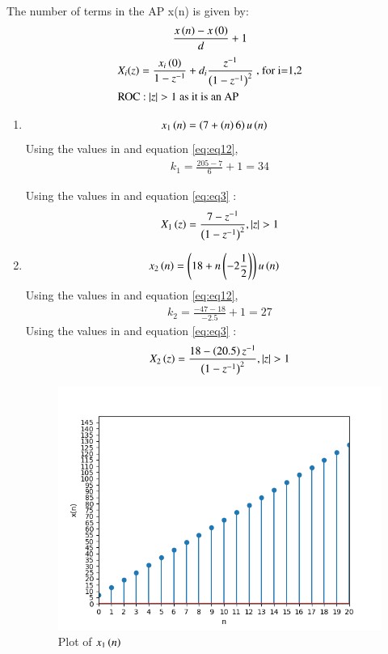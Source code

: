 \documentclass[journal,12pt,twocolumn]{IEEEtran}
\theoremstyle{remark}
\begin{document}

The number of terms in the AP x(n) is given by: 
\begin{align}  \label{eq:eq12}
    \frac{x\left(n\right) - x\left(0\right)}{d} + 1
    \end{align}
\begin{align}
    &X_i(z) = \frac{x_i\left(0\right)}{1 - z^{-1}} + d_i\frac{z^{-1}}{\left(1-z^{-1}\right)^2} \text{ , for i=1,2} \label{eq:eq3}\\
    &\text{ROC : $\left\vert z\right\vert > 1$ as it is an AP}   
\end{align}
\begin{enumerate}
    \item 
\begin{align}
x_{1}\left(n\right) &= \left(7 + \left(n\right)6\right)u\left(n\right)
\end{align}
Using the values in  and equation \eqref{eq:eq12},
\begin{align}
    k_1 = \frac{205 - 7}{6} + 1 = 34
\end{align}

Using the values in  and equation \eqref{eq:eq3} :
\begin{align}
 X_1\left(z\right) = \frac{7 - z^{-1}}{\left(1-z^{-1}\right)^2} , \left\vert z\right\vert > 1
 \end{align}
 
\item
\begin{align}
x_{2}\left(n\right) &= \left(18 + n\left(-2\frac{1}{2}\right)\right)u\left(n\right)
 \end{align}
 Using the values in  and equation \eqref{eq:eq12},
\begin{align}
    k_2 = \frac{-47 - 18}{-2.5} + 1 = 27
\end{align}
Using the values in  and equation \eqref{eq:eq3} :
\begin{align} 
 X_2\left(z\right) = \frac{18 - \left(20.5\right)z^{-1}}{\left(1 - z^{-1}\right)^2} , \left\vert z\right\vert > 1
\end{align}


\begin{figure}[!ht]
\centering
\begin{center}
\includegraphics[width=\columnwidth]{Figure_1}
\caption{Plot of $x_1\left(n\right)$}
\end{center}
\end{figure}


\end{enumerate}
\end{document}
